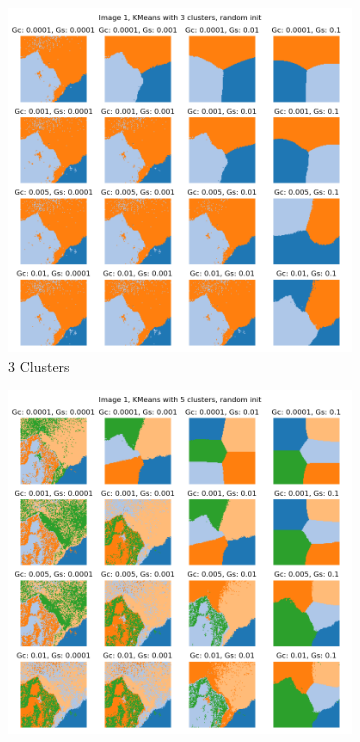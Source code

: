 \documentclass{homework}
\begin{document}
\begin{figure}[H]
    \centering
    \begin{subfigure}{0.32\textwidth}
        \centering
        \includegraphics[width=\textwidth]{output_grid/image1_kmeans-random-3.png}
        \caption{3 Clusters}
    \end{subfigure}
    \begin{subfigure}{0.32\textwidth}
        \centering
        \includegraphics[width=\textwidth]{output_grid/image1_kmeans-random-5.png}

\end{subfigure}
\end{figure}
\end{document}
